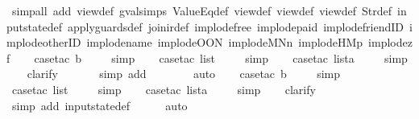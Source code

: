 \begin{isabellebody}
\ {\isacharparenleft}simp{\isacharunderscore}all\ add{\isacharcolon}\ view{\isacharunderscore}def\ gval{\isachardot}simps\ ValueEq{\isacharunderscore}def\ view{}{\isacharunderscore}def\ view{}{\isacharunderscore}def\ view{}{\isacharunderscore}def\ Str{\isacharunderscore}def\ input{}state{\isacharunderscore}def\ apply{\isacharunderscore}guards{\isacharunderscore}def\ join{\isacharunderscore}ir{\isacharunderscore}def\ implode{\isacharunderscore}free\ implode{\isacharunderscore}paid\ implode{\isacharunderscore}friendID\ implode{\isacharunderscore}otherID\ implode{\isacharunderscore}name\ implode{\isacharunderscore}OON\ implode{\isacharunderscore}MNn{}\ implode{\isacharunderscore}HM{}p\ implode{\isacharunderscore}{}z{}f{\isacharparenright}\isanewline
\ \ \isamarkupfalse%
\ {\isacharparenleft}case{\isacharunderscore}tac\ b{\isacharparenright}\isanewline
\ \ \ \isamarkupfalse%
\ simp\isanewline
\ \ \isamarkupfalse%
\ {\isacharparenleft}case{\isacharunderscore}tac\ list{\isacharparenright}\isanewline
\ \ \ \isamarkupfalse%
\ simp\isanewline
\ \ \isamarkupfalse%
\ {\isacharparenleft}case{\isacharunderscore}tac\ lista{\isacharparenright}\isanewline
\ \ \ \isamarkupfalse%
\ simp\isanewline
\ \ \isamarkupfalse%
\ clarify\isanewline
\ \ \ \ \ \isamarkupfalse%
\ {\isacharparenleft}simp\ add{\isacharcolon}\ {\isacharparenright}\isanewline
\ \ \ \ \ \isamarkupfalse%
\ auto{\isacharbrackleft}{}{\isacharbrackright}\isanewline
\ \ \isamarkupfalse%
\ {\isacharparenleft}case{\isacharunderscore}tac\ b{\isacharparenright}\isanewline
\ \ \ \isamarkupfalse%
\ simp\isanewline
\ \ \isamarkupfalse%
\ {\isacharparenleft}case{\isacharunderscore}tac\ list{\isacharparenright}\isanewline
\ \ \ \isamarkupfalse%
\ simp\isanewline
\ \ \isamarkupfalse%
\ {\isacharparenleft}case{\isacharunderscore}tac\ lista{\isacharparenright}\isanewline
\ \ \ \isamarkupfalse%
\ simp\isanewline
\ \ \isamarkupfalse%
\ clarify\isanewline
\ \ \ \isamarkupfalse%
\ {\isacharparenleft}simp\ add{\isacharcolon}\ input{}state{\isacharunderscore}def{\isacharparenright}\isanewline
\ \ \ \ \isamarkupfalse%
\ auto{\isacharbrackleft}{}{\isacharbrackright}\isanewline
\ \ \isamarkupfalse%

\end{isabellebody}
